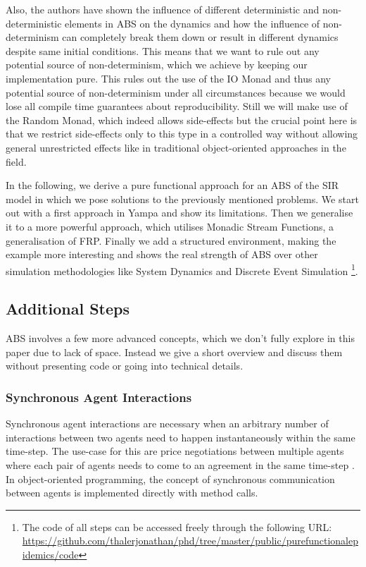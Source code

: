 Also, the authors \cite{thaler_art_2017} have shown the influence of different deterministic and non-deterministic elements in ABS on the dynamics and how the influence of non-determinism can completely break them down or result in different dynamics despite same initial conditions. This means that we want to rule out any potential source of non-determinism, which we achieve by keeping our implementation pure. This rules out the use of the IO Monad and thus any potential source of non-determinism under all circumstances because we would lose all compile time guarantees about reproducibility. Still we will make use of the Random Monad, which indeed allows side-effects but the crucial point here is that we restrict side-effects only to this type in a controlled way without allowing general unrestricted effects like in traditional object-oriented approaches in the field.

In the following, we derive a pure functional approach for an ABS of the SIR model in which we pose solutions to the previously mentioned problems. We start out with a first approach in Yampa and show its limitations. Then we generalise it to a more powerful approach, which utilises Monadic Stream Functions, a generalisation of FRP. Finally we add a structured environment, making the example more interesting and shows the real strength of ABS over other simulation methodologies like System Dynamics and Discrete Event Simulation \footnote{The code of all steps can be accessed freely through the following URL: \url{https://github.com/thalerjonathan/phd/tree/master/public/purefunctionalepidemics/code}}.







\subsection{Additional Steps}
ABS involves a few more advanced concepts, which we don't fully explore in this paper due to lack of space. Instead we give a short overview and discuss them without presenting code or going into technical details.

\subsubsection{Synchronous Agent Interactions}
Synchronous agent interactions are necessary when an arbitrary number of interactions between two agents need to happen instantaneously within the same time-step. The use-case for this are price negotiations between multiple agents where each pair of agents needs to come to an agreement in the same time-step \cite{epstein_growing_1996}. In object-oriented programming, the concept of synchronous communication between agents is implemented directly with method calls.


